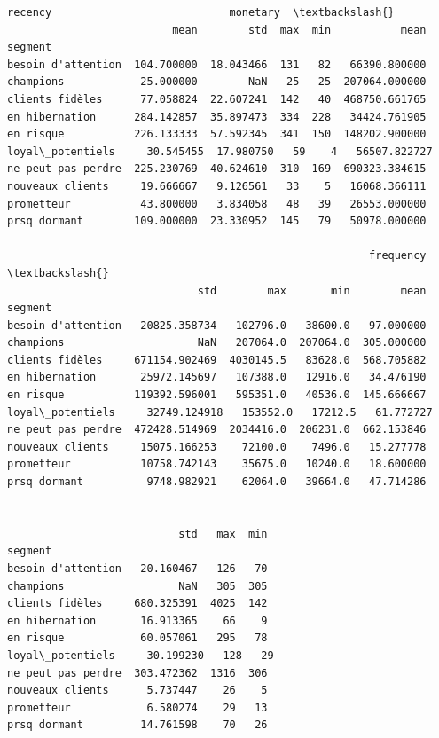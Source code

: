 \documentclass[11pt]{article}
\makeatletter
\newcommand{\boxspacing}{\kern\kvtcb@left@rule\kern\kvtcb@boxsep}
\newcommand{\prompt}[4]{
        {\ttfamily\llap{{\color{#2}[#3]:\hspace{3pt}#4}}\vspace{-\baselineskip}}
    }
\makeatother
\begin{document}
            \begin{tcolorbox}[breakable, size=fbox, boxrule=.5pt, pad at break*=1mm, opacityfill=0]
\prompt{Out}{outcolor}{40}{\boxspacing}
\begin{Verbatim}[commandchars=\\\{\}]
                       recency                            monetary  \textbackslash{}
                          mean        std  max  min           mean
segment
besoin d'attention  104.700000  18.043466  131   82   66390.800000
champions            25.000000        NaN   25   25  207064.000000
clients fidèles      77.058824  22.607241  142   40  468750.661765
en hibernation      284.142857  35.897473  334  228   34424.761905
en risque           226.133333  57.592345  341  150  148202.900000
loyal\_potentiels     30.545455  17.980750   59    4   56507.822727
ne peut pas perdre  225.230769  40.624610  310  169  690323.384615
nouveaux clients     19.666667   9.126561   33    5   16068.366111
prometteur           43.800000   3.834058   48   39   26553.000000
prsq dormant        109.000000  23.330952  145   79   50978.000000

                                                         frequency  \textbackslash{}
                              std        max       min        mean
segment
besoin d'attention   20825.358734   102796.0   38600.0   97.000000
champions                     NaN   207064.0  207064.0  305.000000
clients fidèles     671154.902469  4030145.5   83628.0  568.705882
en hibernation       25972.145697   107388.0   12916.0   34.476190
en risque           119392.596001   595351.0   40536.0  145.666667
loyal\_potentiels     32749.124918   153552.0   17212.5   61.772727
ne peut pas perdre  472428.514969  2034416.0  206231.0  662.153846
nouveaux clients     15075.166253    72100.0    7496.0   15.277778
prometteur           10758.742143    35675.0   10240.0   18.600000
prsq dormant          9748.982921    62064.0   39664.0   47.714286


                           std   max  min
segment
besoin d'attention   20.160467   126   70
champions                  NaN   305  305
clients fidèles     680.325391  4025  142
en hibernation       16.913365    66    9
en risque            60.057061   295   78
loyal\_potentiels     30.199230   128   29
ne peut pas perdre  303.472362  1316  306
nouveaux clients      5.737447    26    5
prometteur            6.580274    29   13
prsq dormant         14.761598    70   26
\end{Verbatim}
\end{tcolorbox}
        
\end{document}
